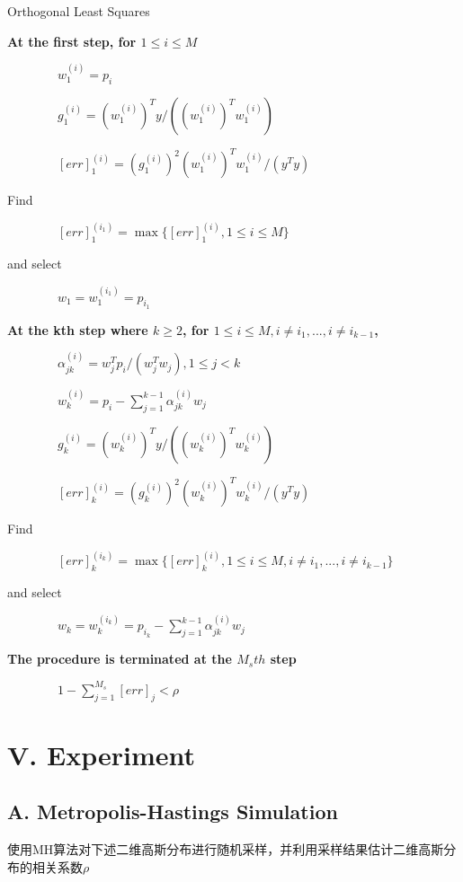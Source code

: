 \documentclass[twocolumn]{article}
\begin{document}
\begin{algorithm}[htb]
\caption{Orthogonal Least Squares}
\textbf{At the first step, for $1 \leq i \leq M$}

\ \ \ \ \ \ \ \ $w_1^(i)=p_i$

\ \ \ \ \ \ \ \ $g_1^(i)=(w_1^{(i)})^Ty/((w_1^{(i)})^Tw_1^{(i)})$

\ \ \ \ \ \ \ \ $[err]_1^{(i)}=(g_1^{(i)})^2(w_1^{(i)})^Tw_1^{(i)}/(y^Ty)$

Find

\ \ \ \ \ \ \ \ $[err]_1^{(i_1)}=\max\{[err]_1^{(i)}, 1\leq i \leq M\}$

and select

\ \ \ \ \ \ \ \ $w_1 = w_1^{(i_1)}=p_{i_1}$

\textbf{At the kth step where $k\geq 2$, for $1\leq i\leq M, i\neq i_1, ..., i\neq i_{k-1}$, }

\ \ \ \ \ \ \ \ $\alpha_{jk}^{(i)}=w_j^Tp_i/(w_j^Tw_j), 1\leq j<k$

\ \ \ \ \ \ \ \ $w_k^{(i)}=p_i-\sum_{j=1}^{k-1}\alpha_{jk}^{(i)}w_j$

\ \ \ \ \ \ \ \ $g_k^(i)=(w_k^{(i)})^Ty/((w_k^{(i)})^Tw_k^{(i)})$

\ \ \ \ \ \ \ \ $[err]_k^{(i)}=(g_k^{(i)})^2(w_k^{(i)})^Tw_k^{(i)}/(y^Ty)$

Find

\ \ \ \ \ \ \ \ $[err]_k^{(i_k)}=\max\{[err]_k^{(i)}, 1\leq i \leq M, i\neq i_1, ..., i\neq i_{k-1}\}$

and select

\ \ \ \ \ \ \ \ $w_k = w_k^{(i_k)}=p_{i_k}-\sum_{j=1}^{k-1}\alpha_{jk}^{(i)}w_j$

\textbf{The procedure is terminated at the $M_sth$ step}

\ \ \ \ \ \ \ \ $1-\sum_{j=1}^{M_s}[err]_j<\rho$

\end{algorithm}

\section*{\centering V. Experiment}

\subsection*{A. Metropolis-Hastings Simulation}

使用MH算法对下述二维高斯分布进行随机采样，并利用采样结果估计二维高斯分布的相关系数$\rho$
\end{document}
